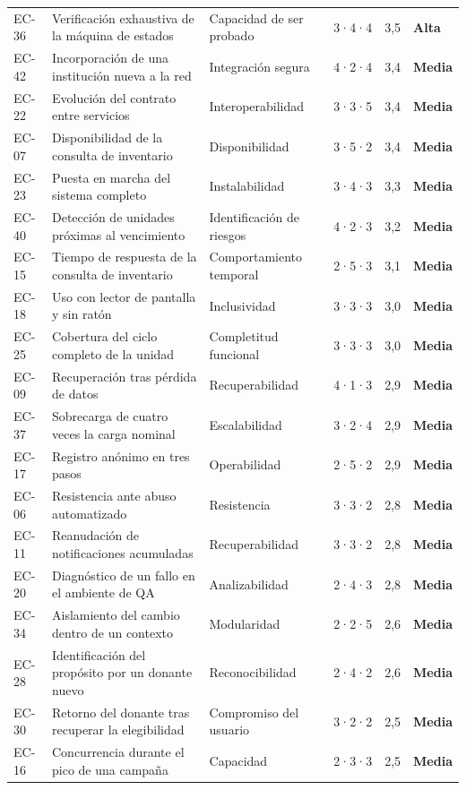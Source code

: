 \documentclass[11pt,a4paper]{article}
\newcommand{\balta}{\textcolor{vinoclaro}{\textbf{Alta}}}
\newcommand{\bmedia}{\textcolor{ringProbar}{\textbf{Media}}}
\begin{document}
\begin{longtable}{L{1.2cm} L{4.4cm} L{2.8cm} L{1.7cm} L{0.9cm} L{1.6cm}}
EC-36 & Verificación exhaustiva de la máquina de estados & Capacidad de ser probado & 3·4·4 & 3,5 & \balta{} \\
EC-42 & Incorporación de una institución nueva a la red & Integración segura & 4·2·4 & 3,4 & \bmedia{} \\
EC-22 & Evolución del contrato entre servicios & Interoperabilidad & 3·3·5 & 3,4 & \bmedia{} \\
EC-07 & Disponibilidad de la consulta de inventario & Disponibilidad & 3·5·2 & 3,4 & \bmedia{} \\
EC-23 & Puesta en marcha del sistema completo & Instalabilidad & 3·4·3 & 3,3 & \bmedia{} \\
EC-40 & Detección de unidades próximas al vencimiento & Identificación de riesgos & 4·2·3 & 3,2 & \bmedia{} \\
EC-15 & Tiempo de respuesta de la consulta de inventario & Comportamiento temporal & 2·5·3 & 3,1 & \bmedia{} \\
EC-18 & Uso con lector de pantalla y sin ratón & Inclusividad & 3·3·3 & 3,0 & \bmedia{} \\
EC-25 & Cobertura del ciclo completo de la unidad & Completitud funcional & 3·3·3 & 3,0 & \bmedia{} \\
EC-09 & Recuperación tras pérdida de datos & Recuperabilidad & 4·1·3 & 2,9 & \bmedia{} \\
EC-37 & Sobrecarga de cuatro veces la carga nominal & Escalabilidad & 3·2·4 & 2,9 & \bmedia{} \\
EC-17 & Registro anónimo en tres pasos & Operabilidad & 2·5·2 & 2,9 & \bmedia{} \\
EC-06 & Resistencia ante abuso automatizado & Resistencia & 3·3·2 & 2,8 & \bmedia{} \\
EC-11 & Reanudación de notificaciones acumuladas & Recuperabilidad & 3·3·2 & 2,8 & \bmedia{} \\
EC-20 & Diagnóstico de un fallo en el ambiente de QA & Analizabilidad & 2·4·3 & 2,8 & \bmedia{} \\
EC-34 & Aislamiento del cambio dentro de un contexto & Modularidad & 2·2·5 & 2,6 & \bmedia{} \\
EC-28 & Identificación del propósito por un donante nuevo & Reconocibilidad & 2·4·2 & 2,6 & \bmedia{} \\
EC-30 & Retorno del donante tras recuperar la elegibilidad & Compromiso del usuario & 3·2·2 & 2,5 & \bmedia{} \\
EC-16 & Concurrencia durante el pico de una campaña & Capacidad & 2·3·3 & 2,5 & \bmedia{} \\

\end{longtable}
\end{document}
